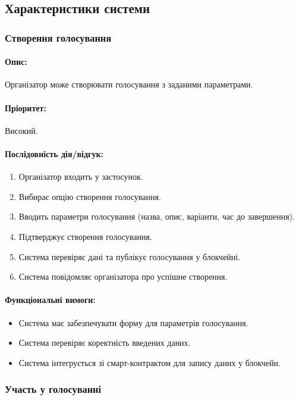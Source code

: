 \documentclass[14pt]{extreport}
\newcounter{req}[subsubsection]
\newcommand\req{\arabic{req}\stepcounter{req}}
\begin{document}
  \subsection{Характеристики системи}
  \subsubsection{Створення голосування}  
  \paragraph{Опис:} Організатор може створювати голосування з заданими параметрами.  
  \paragraph{Пріоритет:} Високий.
  \paragraph{Послідовність дія/відгук:}  
  \begin{enumerate}  
      \item Організатор входить у застосунок.  
      \item Вибирає опцію створення голосування.  
      \item Вводить параметри голосування (назва, опис, варіанти, час до завершення).  
      \item Підтверджує створення голосування.  
      \item Система перевіряє дані та публікує голосування у блокчейні.  
      \item Система повідомляє організатора про успішне створення.  
  \end{enumerate}
  \paragraph{Функціональні вимоги:}
  \begin{itemize}[leftmargin=*,label=REQ-.\req:]  
      \item Система має забезпечувати форму для параметрів голосування.
      \item Система перевіряє коректність введених даних.
      \item Система інтегрується зі смарт-контрактом для запису даних у блокчейн.  
  \end{itemize}

  \subsubsection{Участь у голосуванні}  
\end{document}
